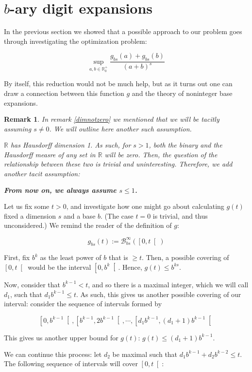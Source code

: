 \documentclass[11pt]{amsart}
\newcommand{\R}{\mathbb{R}}
\newcommand{\BB}{\mathcal{B}}
\newtheorem{remark}{Remark}
\begin{document}
\section{$b$-ary digit expansions}

In the previous section we showed that a possible approach to our problem goes through investigating the optimization problem:

\[ \sup_{a,b \in \R^+_0} \frac{g_{bs}(a) + g_{bs}(b)}{(a + b)^s} \]

By itself, this reduction would not be much help, but as it turns out one can draw a connection between this function $g$ and the theory of noninteger base expansions.

\begin{remark}
In remark \ref{dimnotzero} we mentioned that we will be tacitly assuming $s \neq 0$. We will outline here another such assumption.

$\R$ has Hausdorff dimension 1. As such, for $s > 1$, both the binary and the Hausdorff measre of \emph{any} set in $\R$ will be zero. Then, the question of the relationship between these two is trivial and uninteresting. Therefore, we add another tacit assumption:

\textbf{From now on, we always assume $s \leq 1$.}
\end{remark}

Let us fix some $t > 0$, and investigate how one might go about calculating $g(t)$ fixed a dimension $s$ and a base $b$. (The case $t = 0$ is trivial, and thus unconsidered.) We remind the reader of the definition of $g$:

\[g_{bs}(t) := \BB_{bs}^\infty(\left[0, t \right[)\]

First, fix $b^k$ as the least power of $b$ that is $\geq t$. Then, a possible covering of $\left[0, t \right[$ would be the interval $\left[0, b^k\right[$. Hence, $g(t) \leq b^{ks}$.

Now, consider that $b^{k-1} < t$, and so there is a maximal integer, which we will call $d_1$, such that $d_1 b^{k-1} \leq t$. As such, this gives us another possible covering of our interval: consider the sequence of intervals formed by

\[\left[0, b^{k-1} \right[, \left[b^{k-1}, 2 b^{k-1} \right[, \cdots, \left[d_1 b^{k-1}, (d_1 + 1) b^{k-1} \right[ \]

This gives us another upper bound for $g(t)$: $g(t) \leq (d_1 + 1) b^{k-1}$.

We can continue this process: let $d_2$ be maximal such that $d_1 b^{k-1} + d_2 b^{k-2} \leq t$. The following sequence of intervals will cover $\left[0, t \right[$:
\end{document}

